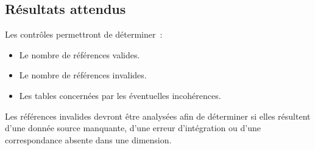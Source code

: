 \subsection{Résultats attendus}

\noindent Les contrôles permettront de déterminer~:
\begin{itemize}
	\item Le nombre de références valides.
	\item Le nombre de références invalides.
	\item Les tables concernées par les éventuelles incohérences.
\end{itemize}

\noindent Les références invalides devront être analysées afin de déterminer si elles résultent d'une donnée source manquante, d'une erreur d'intégration ou d'une correspondance absente dans une dimension.

